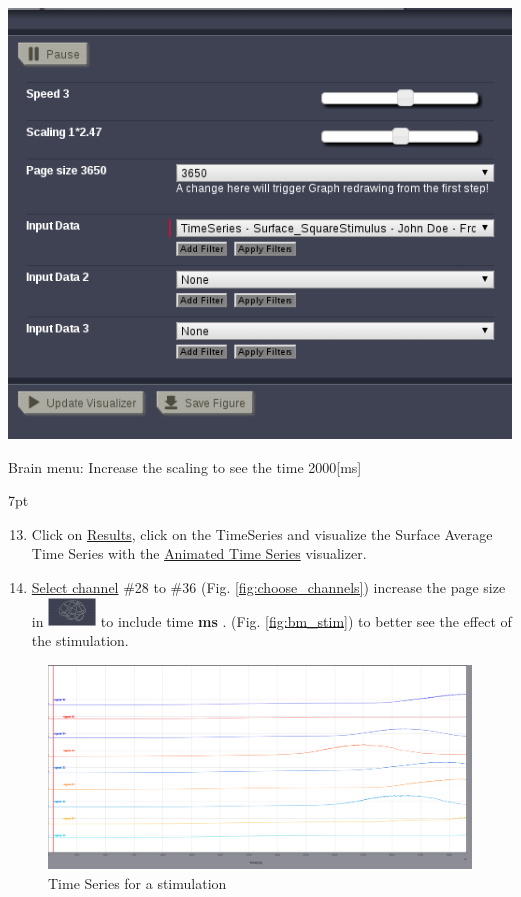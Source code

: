 \documentclass{tufte-handout}
\newenvironment{simulation}{%
  \def\FrameCommand{%
    \hspace{1pt}%
    {\color{ForestGreen}\vrule width 2pt}%
    {\color{simulationshade}\vrule width 4pt}%
    \colorbox{simulationshade}%
  }%
  \MakeFramed{\advance\hsize-\width\FrameRestore}%
  \noindent\hspace{-4.55pt}%
  \begin{adjustwidth}{}{7pt}%
  \vspace{2pt}\vspace{2pt}%
}
{%
  \vspace{2pt}\end{adjustwidth}\endMakeFramed%
}
\begin{document}
\begin{marginfigure}
  \includegraphics[width=\linewidth]{Handout_UI_ModellingAnEpilepticPatient_BrainMenuStimulation}%
  \caption{Brain menu: Increase the scaling to see the time \unit{2000}[ms]}%
  \label{fig:bm_stim}%
\end{marginfigure}
  \begin{simulation}
  \begin{enumerate}
  \setcounter{enumi}{12}
  \item Click on \underline{Results}, click on the TimeSeries and visualize the Surface Average Time Series with 
  the \underline{Animated Time Series} visualizer.
  \item \underline{Select channel} \#28 to \#36 (Fig. \ref{fig:choose_channels}) increase the page size in \includegraphics[width=0.1\textwidth]{butt_brain_menu} to include time \textbf{\unit[2000]{ms}} .
  (Fig. \ref{fig:bm_stim}) to better see the effect of the stimulation.
 
\end{enumerate}
\end{simulation}



\begin{figure}[h]
  \includegraphics[width=\linewidth]{Handout_UI_ModellingAnEpilepticPatient_StimulationTimeSeries}%
  \caption{Time Series for a stimulation}%
  \label{fig:stim_ts}%
\end{figure}
\end{document}

